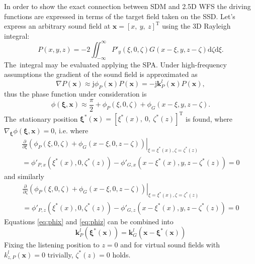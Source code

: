 \documentclass[12pt,a4paper]{article}
\newcommand{\td}{\mathrm{d}}
\newcommand{\ti}{\mathrm{j}}
\newcommand{\vx}{\mathbf{x}}
\newcommand{\vxi}{\bm{\xi}}
\newcommand{\vk}{\mathbf{k}}
\begin{document}
In order to show the exact connection between SDM and 2.5D WFS the driving functions are expressed in terms of the target field taken on the SSD.
Let's express an arbitrary sound field at $\vx = [x,\ y,\ z]^{\mathrm{T}}$ using the 3D Rayleigh integral:
\begin{equation}
P(x,y,z) = -2 \iint_{-\infty}^{\infty} P'_y(\xi,0,\zeta) G(x-\xi,y,z-\zeta) \td \zeta \td \xi.
\end{equation}
The~integral may be evaluated applying the SPA.
Under high-frequency assumptions the gradient of the sound field is approximated as
\begin{equation}
\nabla P(\vx) \approx \ti \phi_P(\vx) P(\vx) = -\ti \vk_P^l(\vx) P(\vx),
\end{equation}
%
thus the phase function under consideration is
%
\begin{equation}
\phi(\vxi,\vx) \approx \frac{\pi}{2} + \phi_P(\xi,0,\zeta) + \phi_G(x-\xi,y,z-\zeta).
\label{eq:Rayleigh_phase}
\end{equation}
%
The~stationary position
$\vxi^*(\vx) = [\xi^*(x),\ 0,\ \zeta^*(z)]^{\mathrm{T}}$
is found, where
$\nabla_{\vxi} \phi(\vxi,\vx) = 0$,
i.e. where
\begin{eqnarray}
\left.
\frac{\partial}{\partial \xi} \left( \phi_P(\xi,0,\zeta) + \phi_G(x-\xi,0,z-\zeta) \right)\right|_{\xi = \xi^*(x), \zeta = \zeta^*(z)} \nonumber \\
=
\phi'_{P,x}(\xi^*(x),0,\zeta^*(z)) - \phi'_{G,x}(x-\xi^*(x),y,z-\zeta^*(z)) = 0
\label{eq:phix}
\end{eqnarray}
%
and similarly
%
\begin{eqnarray}
\left. \frac{\partial}{\partial \zeta} \left( \phi_P(\xi,0,\zeta) + \phi_G(x-\xi,0,z-\zeta) \right)\right|_{\xi = \xi^*(x), \zeta = \zeta^*(z)} \nonumber \\
=
\phi'_{P,z}(\xi^*(x),0,\zeta^*(z)) - \phi'_{G,z}(x-\xi^*(x),y,z-\zeta^*(z)) = 0
\label{eq:phiz}
\end{eqnarray}
%
Equations \eqref{eq:phix} and \eqref{eq:phiz} can be combined into
%
\begin{equation}
\vk^l_P(\vxi^*(\vx)) = \vk^l_G(\vx - \vxi^*(\vx))
\label{eq:rayleigh_stat_point}
\end{equation}
%
Fixing the listening position to $z=0$ and for virtual sound fields with $k^l_{z,P}(\vx) = 0$ trivially, $\zeta^*(z) = 0$ holds.
\end{document}
